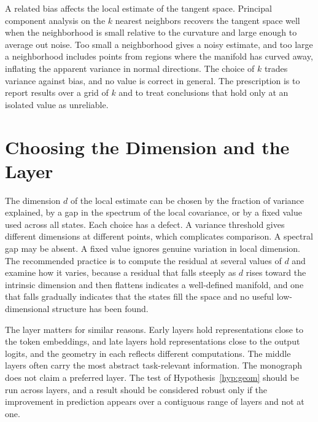 A related bias affects the local estimate of the tangent space. Principal component analysis on the $k$ nearest neighbors recovers the tangent space well when the neighborhood is small relative to the curvature and large enough to average out noise. Too small a neighborhood gives a noisy estimate, and too large a neighborhood includes points from regions where the manifold has curved away, inflating the apparent variance in normal directions. The choice of $k$ trades variance against bias, and no value is correct in general. The prescription is to report results over a grid of $k$ and to treat conclusions that hold only at an isolated value as unreliable.

\section{Choosing the Dimension and the Layer}

The dimension $d$ of the local estimate can be chosen by the fraction of variance explained, by a gap in the spectrum of the local covariance, or by a fixed value used across all states. Each choice has a defect. A variance threshold gives different dimensions at different points, which complicates comparison. A spectral gap may be absent. A fixed value ignores genuine variation in local dimension. The recommended practice is to compute the residual at several values of $d$ and examine how it varies, because a residual that falls steeply as $d$ rises toward the intrinsic dimension and then flattens indicates a well-defined manifold, and one that falls gradually indicates that the states fill the space and no useful low-dimensional structure has been found.

The layer matters for similar reasons. Early layers hold representations close to the token embeddings, and late layers hold representations close to the output logits, and the geometry in each reflects different computations. The middle layers often carry the most abstract task-relevant information. The monograph does not claim a preferred layer. The test of Hypothesis~\ref{hyp:geom} should be run across layers, and a result should be considered robust only if the improvement in prediction appears over a contiguous range of layers and not at one.
